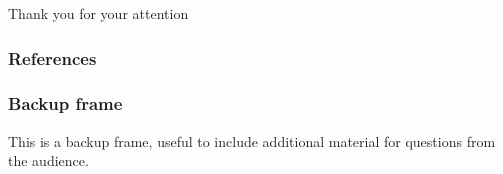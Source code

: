 \documentclass{beamer}
\begin{document}
\begin{frame}[standout]
	Thank you for your attention
\end{frame}

\appendix
\begin{frame}
	\frametitle{References}
	\nocite{*}
    
    
\end{frame}

\begin{frame}
	\frametitle{Backup frame}
	This is a backup frame, useful to include additional material for questions from the audience.
\end{frame}
\end{document}
